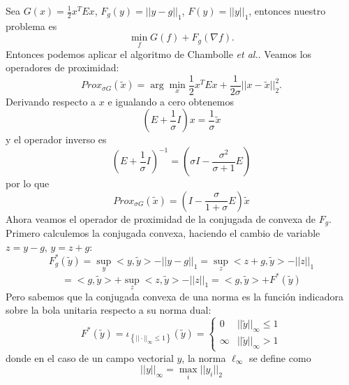 \documentclass[12pt,draftcls, onecolumn, letterpaper,compsoc]{IEEEtran}
\begin{document}
Sea $G(x)=\frac{1}{2}x^T E x$, $F_{g}(y) = ||y-g||_1$, $F(y) = ||y||_1$, entonces nuestro problema es
\begin{equation}
    \min_{f} G(f) + F_{g}(\nabla f).
\end{equation}
Entonces podemos aplicar el algoritmo de Chambolle {\it et al.}. Veamos los operadores de proximidad:
\begin{equation}
    Prox_{\sigma G}(\tilde{x}) = \arg\min_{x} \frac{1}{2}x^T E x + \frac{1}{2\sigma} ||x-\tilde{x}||_{2}^{2}.
\end{equation}
Derivando respecto a $x$ e igualando a cero obtenemos
\begin{equation}
    \left(E+\frac{1}{\sigma}I\right)x = \frac{1}{\sigma}\tilde{x}
\end{equation}
y el operador inverso es
\begin{equation}
    \left(E+\frac{1}{\sigma}I\right)^{-1} = \left(\sigma I - \frac{\sigma^{2}}{\sigma + 1}E \right)
\end{equation}
por lo que
\begin{displaymath}
    Prox_{\sigma G}(\tilde{x}) = \left( I-\frac{\sigma}{1+\sigma}E \right)\tilde{x}
\end{displaymath}
Ahora veamos el operador de proximidad de la conjugada de convexa de $F_g$. Primero calculemos la conjugada convexa, haciendo el cambio de variable $z=y-g$, $y=z+g$:
\begin{displaymath}
    F^{*}_{g}(\tilde{y}) = \sup_{y} <y, \tilde{y}> - ||y-g||_{1} = \sup_{z} <z+g, \tilde{y}> - ||z||_{1}
\end{displaymath}
\begin{displaymath}
    =<g, \tilde{y}> + \sup_{z} <z, \tilde{y}> - ||z||_{1} = <g, \tilde{y}> + F^{*}(\tilde{y})
\end{displaymath}
Pero sabemos que la conjugada convexa de una norma es la funci\'{o}n indicadora sobre la bola unitaria respecto a su norma dual:
\begin{equation}
    F^{*}(\tilde{y}) = \iota_{\left\lbrace ||\cdot||_{\infty}\leq 1 \right\rbrace}(\tilde{y}) = \left\lbrace \begin{array}{ll}
        0   &   ||\tilde{y}||_{\infty} \leq 1\\
        \infty   &   ||\tilde{y}||_{\infty} > 1
        \end{array}\right.
\end{equation}
donde en el caso de un campo vectorial $y$, la norma $\ell_{\infty}$ se define como
\begin{equation}
    ||y||_{\infty} = \max_{i} ||y_i||_2
\end{equation}
\end{document}
